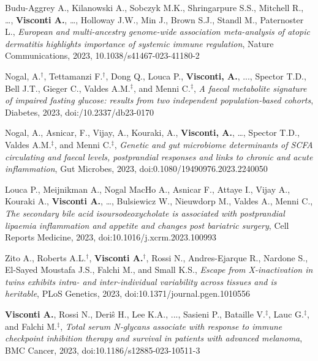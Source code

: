 \documentclass[a4paper,10pt]{article}
\begin{document}
{\begin{itemize}
		  Budu-Aggrey A., Kilanowski A., Sobczyk M.K., Shringarpure S.S., Mitchell R., \dots,  \textbf{Visconti A.}, \dots, Holloway J.W., Min J., Brown S.J., Standl M., Paternoster L., \emph{European and multi-ancestry genome-wide association meta-analysis of atopic dermatitis highlights importance of systemic immune regulation}, Nature Communications, 2023, 10.1038/s41467-023-41180-2
		
		 Nogal, A.$^{\textbf{$\dag $}}$, Tettamanzi F.$^{\textbf{$\dag $}}$, Dong Q., Louca P., \textbf{Visconti, A.}, ...,  Spector T.D., Bell J.T., Gieger C., Valdes A.M.$^{\textbf{$\ddag $}}$, and Menni C.$^{\textbf{$\ddag $}}$, \emph{A faecal metabolite signature of impaired fasting glucose: results from two independent population-based cohorts}, Diabetes, 2023, doi:/10.2337/db23-0170
		
		 Nogal, A., Asnicar, F., Vijay, A., Kouraki, A., \textbf{Visconti, A.}, \dots, Spector T.D., Valdes A.M.$^{\textbf{$\ddag $}}$, and Menni C.$^{\textbf{$\ddag $}}$, \emph{Genetic and gut microbiome determinants of SCFA circulating and faecal levels, postprandial responses and links to chronic and acute inflammation}, Gut Microbes, 2023, doi:0.1080/19490976.2023.2240050
		
		 Louca P., Meijnikman A., Nogal MacHo A., Asnicar F., Attaye I., Vijay A., Kouraki A., \textbf{Visconti A.}, \dots, Bulsiewicz W., Nieuwdorp M., Valdes A., Menni C., \emph{The secondary bile acid isoursodeoxycholate is associated with postprandial lipaemia inflammation and appetite and changes post bariatric surgery}, Cell Reports Medicine, 2023, doi:10.1016/j.xcrm.2023.100993
		
		  Zito A., Roberts A.L.$^{\textbf{$\dag $}}$, \textbf{Visconti A.}$^{\textbf{$\dag $}}$, Rossi N., Andres-Ejarque R., Nardone S., El-Sayed Moustafa J.S., Falchi M., and Small K.S., \emph{Escape from X-inactivation in twins exhibits intra- and inter-individual variability across tissues and is heritable}, PLoS Genetics, 2023, doi:10.1371/journal.pgen.1010556
				
		 \textbf{Visconti A.}, Rossi N., Deri\^s H., Lee K.A., ..., Sasieni P., Bataille V.$^{\textbf{$\ddag $}}$,  Lauc G.$^{\textbf{$\ddag $}}$, and Falchi M.$^{\textbf{$\ddag $}}$, \emph{Total serum N‐glycans associate with response to immune checkpoint inhibition therapy and survival in patients with advanced melanoma}, BMC Cancer, 2023, doi:10.1186/s12885-023-10511-3
						

	\end{itemize}
}
\end{document}
